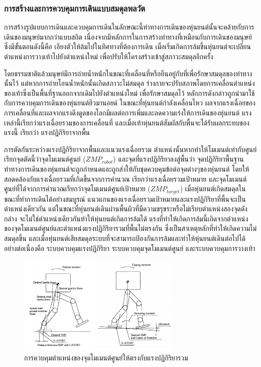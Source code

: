 \subsubsection{การสร้างและการควบคุมการเดินแบบสมดุลพลวัต}
การสร้างรูปแบบการเดินและควบคุมการเดินในลักษณะนี้ท่าทางการเดินของหุ่นยนต์นั้นจะคล้ายกับการเดินของมนุษย์มากกว่าแบบสถิต
เนื่องจากมีหลักการในการสร้างท่าทางที่เหมือนกับการเดินของมนุษย์ซึ่งมีขั้นตอนดังนี้คือ เอียงตัวให้ล้มไปในทิศทางที่ต้องการเดิน
เมื่อเริ่มเกิดการล้มขึ้นหุ่นยนต์จะเปลี่ยนตำแหน่งการวางเท้าไปยังตำแหน่งใหม่ เพื่อปรับให้โครงสร้างเข้าสู่สภาวะสมดุลอีกครั้ง

โดยธรรมชาติแล้วมนุษย์มีการถ่ายน้ำหนักในขณะที่เคลื่อนที่หรือยืนอยู่กับที่เพื่อรักษาสมดุลของท่าทางนั้นไว้
แต่หากการถ่ายโอนน้ำหนักนั้นเกิดสภาวะไม่สมดุล ร่างกายจะปรับสภาพโดยการเคลื่อนตำแหน่งของเท้าซึ่งเป็นพื้นที่ฐานออกจากเดิมไปยังตำแหน่งใหม่
เพื่อรักษาสมดุลไว้ หลักการดังกล่าวถูกนำมาใช้กับการควบคุมการเดินของหุ่นยนต์ฮิวมานอยด์ ในขณะที่หุ่นยนต์กำลังเคลื่อนไหว
ผลจากแรงเฉื่อยของการเคลื่อนที่และผลจากแรงดึงดูดของโลกมีผลต่อการเพิ่มและลดความเร่งให้การเดินของหุ่นยนต์
แรงเหล่านี้เรียกว่าแรงเฉื่อยรวมของการเคลื่อนที่ และเมื่อเท้าหุ่นยนต์สัมผัสกับพื้นจะได้รับผลกระทบของแรงนี้ เรียกว่า
แรงปฏิกิริยาจากพื้น

การตัดกันระหว่างแรงปฏิกิริยาจากพื้นและแนวแรงเฉื่อยรวม ตำแหน่งนั้นหากทำให้โมเมนต์เท่ากับศูนย์
เรียกจุดตัดนี้ว่าจุดโมเมนต์ศูนย์ ($ZMP_{robot}$) และจุดที่แรงปฏิกิริยาลงสู่พื้นว่า จุดปฏิกิริยาพื้นฐาน 
ท่าทางการเดินของหุ่นยนต์จะถูกกำหนดและถูกส่งให้กับชุดควบคุมข้อต่อจุดต่างๆของหุ่นยนต์ โดยให้สอดคล้องกับแรงเฉื่อยรวมที่เกิดขึ้นจากการคำนวณ
เรียกว่าแรงเฉื่อยรวมเป้าหมาย และจุดโมเมนต์ศูนย์ที่ได้จากการคำนวณเรียกว่าจุดโมเมนต์ศูนย์เป้าหมาย ($ZMP_{target}$)
เมื่อหุ่นยนต์เกิดสมดุลในขณะที่ทำการเดินได้อย่างสมบูรณ์ แนวแกนของแรงเฉื่อยรวมเป้าหมายและแรงปฏิกิริยาที่พื้นจะเป็นตำแหน่งเดียวกัน
แต่ในขณะที่หุ่นยนต์เดินผ่านพื้นผิวที่มีความขรุขระหรือไม่เรียบตำแหน่งสองจุดดังกล่าง จะไม่ใช่ตำแหน่งเดียวกันทำให้หุ่นยนต์เกิดการล้มได้
แรงที่ทำให้เกิดการล้มนี้เกิดจากตำแหน่งของจุดโมเมนต์ศูนย์และตำแหน่งแรงปฏิกิริยารวมที่พื้นไม่ตรงกัน ซึ่งเป็นสาเหตุหลักที่ทำให้เกิดความไม่สมดุลขึ้น
และเมื่อหุ่นยนต์เสียสมดุลระบบที่จะสามารถป้องกันการล้มและทำให้หุ่นยนต์เดินต่อไปได้อย่างต่อเนื่องคือ ระบบควบคุมแรงปฏิกิริยา
ระบบควบคุมจุดโมเมนต์ศูนย์ และระบบควบคุมการวางเท้า

\begin{figure}[!ht]
	\centering
	\includegraphics[width=0.7\textwidth]{chapter2/images/zmpdynamicwalking.png}
	\caption{การควบคุมตำแหน่งของจุดโมเมนต์ศูนย์ให้ตรงกับแรงปฏิกิริยารวม}
	\label{fig:robot_zmp_support}
\end{figure}

